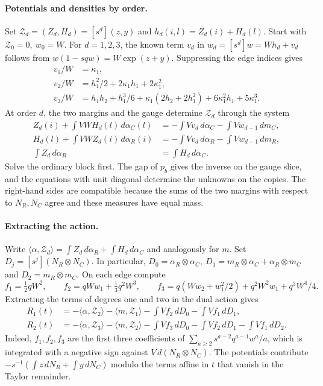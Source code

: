 \paragraph{Potentials and densities by order.} Set \(\mathcal Z_d=(Z_d,H_d)=[s^d](z,y)\) and
\(h_d(i,l)=Z_d(i)+H_d(l)\). Start with \(\mathcal Z_0=0,\ w_0=W\). For \(d=1,2,3\), the known term
\(v_d\) in \(w_d=[s^d]w=Wh_d+v_d\) follows from \(w(1-sqw)=W\exp(z+y)\). Suppressing the edge indices
gives \begin{align*}
 v_1/W&=\kappa_1,\\
 v_2/W&=h_1^2/2+2\kappa_1 h_1+2\kappa_1^2,\\
 v_3/W&=h_1h_2+h_1^3/6+\kappa_1(2h_2+2h_1^2)+6\kappa_1^2h_1+5\kappa_1^3 .
\end{align*} At order \(d\), the two margins and the gauge determine \(\mathcal Z_d\) through the system
\begin{align*}
 Z_d(i)+\int VW H_d(l)\,d\alpha_C(l)
   &=-\int Vv_d\,d\alpha_C-\int Vw_{d-1}\,dm_C ,\\
 H_d(l)+\int VW Z_d(i)\,d\alpha_R(i)
   &=-\int Vv_d\,d\alpha_R-\int Vw_{d-1}\,dm_R ,\\
 \int Z_d\,d\alpha_R&=\int H_d\,d\alpha_C .
\end{align*} Solve the ordinary block first. The gap of \(p_b\) gives the inverse on the gauge slice, and
the equations with unit diagonal determine the unknowns on the copies. The right-hand sides are
compatible because the sums of the two margins with respect to \(N_R,N_C\) agree and these measures have
equal mass.

\paragraph{Extracting the action.} Write \(\langle\alpha,\mathcal Z_d\rangle=\int Z_d\,d\alpha_R+\int
H_d\,d\alpha_C\) and analogously for \(m\). Set \(D_j=[s^j](N_R\otimes N_C)\). In particular,
\(D_0=\alpha_R\otimes\alpha_C,\ D_1=m_R\otimes\alpha_C+\alpha_R\otimes m_C\) and \(D_2=m_R\otimes m_C\).
On each edge compute \[
 f_1=\tfrac12 qW^2,\qquad f_2=qWw_1+\tfrac13q^2W^3,\qquad
 f_3=q(Ww_2+w_1^2/2)+q^2W^2w_1+q^3W^4/4 .
\] Extracting the terms of degrees one and two in the dual action gives \begin{align*}
 R_1(t)&=-\langle\alpha,\mathcal Z_2\rangle-\langle m,\mathcal Z_1\rangle
          -\int Vf_2\,dD_0-\int Vf_1\,dD_1,\\
 R_2(t)&=-\langle\alpha,\mathcal Z_3\rangle-\langle m,\mathcal Z_2\rangle
          -\int Vf_3\,dD_0-\int Vf_2\,dD_1-\int Vf_1\,dD_2 .
\end{align*} Indeed, \(f_1,f_2,f_3\) are the first three coefficients of
\(\sum_{a\ge2}s^{a-2}q^{a-1}w^a/a\), which is integrated with a negative sign against \(V\,d(N_R\otimes
N_C)\). The potentials contribute \(-s^{-1}(\int z\,dN_R+\int y\,dN_C)\) modulo the terms affine in \(t\)
that vanish in the Taylor remainder.
